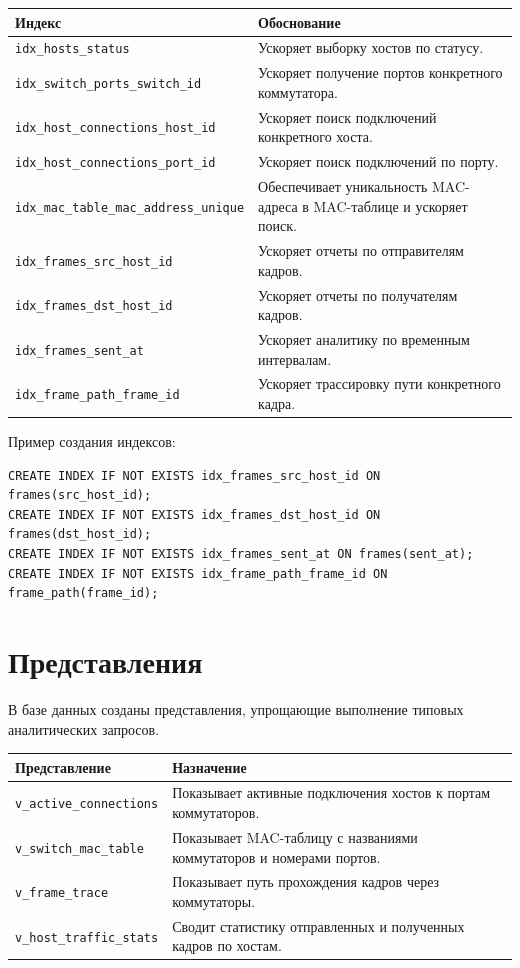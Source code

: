 \documentclass[12pt,a4paper]{article}
\begin{document}
\begin{longtable}{|p{6cm}|p{8.5cm}|}
\hline
\textbf{Индекс} & \textbf{Обоснование}\\
\hline
\texttt{idx\_hosts\_status} & Ускоряет выборку хостов по статусу.\\
\hline
\texttt{idx\_switch\_ports\_switch\_id} & Ускоряет получение портов конкретного коммутатора.\\
\hline
\texttt{idx\_host\_connections\_host\_id} & Ускоряет поиск подключений конкретного хоста.\\
\hline
\texttt{idx\_host\_connections\_port\_id} & Ускоряет поиск подключений по порту.\\
\hline
\texttt{idx\_mac\_table\_mac\_address\_unique} & Обеспечивает уникальность MAC-адреса в MAC-таблице и ускоряет поиск.\\
\hline
\texttt{idx\_frames\_src\_host\_id} & Ускоряет отчеты по отправителям кадров.\\
\hline
\texttt{idx\_frames\_dst\_host\_id} & Ускоряет отчеты по получателям кадров.\\
\hline
\texttt{idx\_frames\_sent\_at} & Ускоряет аналитику по временным интервалам.\\
\hline
\texttt{idx\_frame\_path\_frame\_id} & Ускоряет трассировку пути конкретного кадра.\\
\hline
\end{longtable}

Пример создания индексов:

\begin{lstlisting}[caption={Индексы для таблиц frames и frame\_path}]
CREATE INDEX IF NOT EXISTS idx_frames_src_host_id ON frames(src_host_id);
CREATE INDEX IF NOT EXISTS idx_frames_dst_host_id ON frames(dst_host_id);
CREATE INDEX IF NOT EXISTS idx_frames_sent_at ON frames(sent_at);
CREATE INDEX IF NOT EXISTS idx_frame_path_frame_id ON frame_path(frame_id);
\end{lstlisting}

\section{Представления}

В базе данных созданы представления, упрощающие выполнение типовых аналитических запросов.

\begin{longtable}{|p{5cm}|p{9.5cm}|}
\hline
\textbf{Представление} & \textbf{Назначение}\\
\hline
\texttt{v\_active\_connections} & Показывает активные подключения хостов к портам коммутаторов.\\
\hline
\texttt{v\_switch\_mac\_table} & Показывает MAC-таблицу с названиями коммутаторов и номерами портов.\\
\hline
\texttt{v\_frame\_trace} & Показывает путь прохождения кадров через коммутаторы.\\
\hline
\texttt{v\_host\_traffic\_stats} & Сводит статистику отправленных и полученных кадров по хостам.\\
\hline
\end{longtable}
\end{document}
